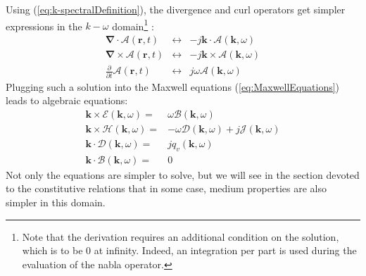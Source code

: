 Using (\ref{eq:k-spectralDefinition}), the divergence and curl operators get simpler expressions in the $k-\omega$ domain\footnote{Note that the derivation requires an additional condition on the solution, which is to be 0 at infinity. Indeed, an integration per part is used during the evaluation of the nabla operator.} :
\begin{eqnarray}
\boldsymbol{\nabla} \cdot\boldsymbol{\mathcal{A}}(\mathbf{r}, t) 
&\leftrightarrow&
 -j\mathbf{k}\cdot \boldsymbol{\mathcal{A}} (\mathbf{k}, \omega)
\\
\boldsymbol{\nabla} \times \boldsymbol{\mathcal{A}} (\mathbf{r}, t) 
&\leftrightarrow& 
-j\mathbf{k}\times \boldsymbol{\mathcal{A}} (\mathbf{k}, \omega)
\\
\frac{\partial}{\partial t} \boldsymbol{\mathcal{A}} (\mathbf{r}, t) 
&\leftrightarrow& 
j \omega \boldsymbol{\mathcal{A}} (\mathbf{k}, \omega)
\end{eqnarray}
Plugging such a solution into the Maxwell equations (\ref{eq:MaxwellEquations}) leads to algebraic equations:
\begin{subequations}
	\begin{align}
	\mathbf{k} \times \boldsymbol{\mathcal{E}} (\mathbf{k}, \omega) 
		=& 
		\omega \boldsymbol{\mathcal{B}} (\mathbf{k}, \omega)
	\\
	\mathbf{k} \times \boldsymbol{\mathcal{H}} (\mathbf{k}, \omega) 
	=& 
	-\omega \boldsymbol{\mathcal{D}} (\mathbf{k}, \omega)
	+ 	
	j\boldsymbol{\mathcal{J}} (\mathbf{k}, \omega) 
	\\
	\mathbf{k}  \cdot \boldsymbol{\mathcal{D}} (\mathbf{k}, \omega) 
		=& jq_v(\mathbf{k}, \omega) 
	\\
	\mathbf{k}  \cdot \boldsymbol{\mathcal{B}} (\mathbf{k}, \omega) 
		=& 0
	\end{align}
	\label{eq:k-omegaMaxwellEquations}
\end{subequations}
Not only the equations are simpler to solve, but we will see in the section devoted to the constitutive relations that in some case, medium properties are also simpler in this domain.  


